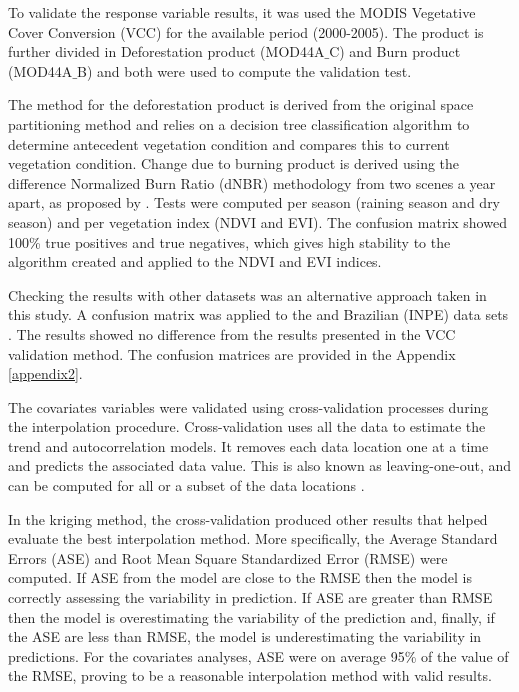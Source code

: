 

To validate the response variable results, it was used the MODIS Vegetative Cover Conversion (VCC) for the available period (2000-2005). The product is further divided in Deforestation product (MOD44A${\_}$C) and Burn product (MOD44A$\_$B) and both were used to compute the validation test. 

The method for the deforestation product is derived from the original space partitioning method \citep{zhan_2002} and relies on a decision tree classification algorithm \citep{breiman_1984} to determine antecedent vegetation condition and compares this to current vegetation condition. Change due to burning product is derived using the difference Normalized Burn Ratio (dNBR) methodology from two scenes a year apart, as proposed by \citet{key_2004}.  Tests were computed per season (raining season and dry season) and per vegetation index (NDVI and EVI). The confusion matrix showed 100\% true positives and true negatives, which gives high stability to the algorithm created and applied to the NDVI and EVI indices. 


Checking the results with other datasets was an alternative approach taken in this study. A confusion matrix was applied to the \citet{Hansen_2013} and Brazilian (INPE) data sets \citep{brito_2018}. The results showed no difference from the results presented in the VCC validation method. The confusion matrices are provided in the Appendix \ref{appendix2}. 

The covariates variables were validated using cross-validation processes during the interpolation procedure. Cross-validation uses all the data to estimate the trend and autocorrelation models. It removes each data location one at a time and predicts the associated data value. This is also known as leaving-one-out, and can be computed for all or a subset of the data locations \citep{esri_2016}.

In the kriging method, the cross-validation produced other results that helped evaluate the best interpolation method. More specifically, the Average Standard Errors (ASE) and Root Mean Square Standardized Error (RMSE) were computed. If ASE from the model are close to the RMSE then the model is correctly assessing the variability in prediction. If ASE are greater than RMSE then the model is overestimating the variability of the prediction and, finally, if the ASE are less than RMSE, the model is underestimating the variability in predictions. For the covariates analyses, ASE were on average 95\% of the value of the RMSE, proving to be a reasonable interpolation method with valid results.

